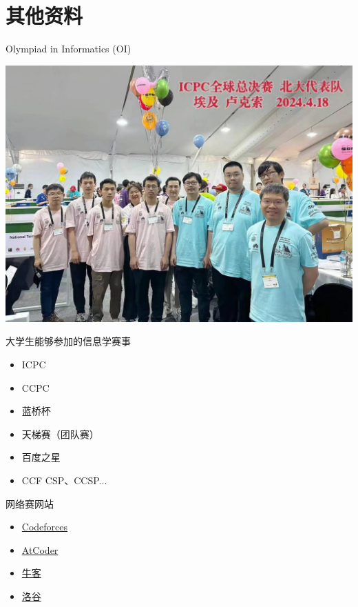 \documentclass[aspectratio=1610]{beamer}
\begin{document}
\section{其他资料}

\begin{frame}{Olympiad in Informatics (OI)}
    \begin{minipage} {0.6\linewidth}
        \centering
        \includegraphics[width=0.8\linewidth]{pic/OI.jpg}
    \end{minipage}
    \begin{minipage}{0.38\linewidth}
        大学生能够参加的信息学赛事
        \begin{center}
            \begin{itemize}
                \item ICPC
                \item CCPC
                \item 蓝桥杯
                \item 天梯赛（团队赛）
                \item 百度之星
                \item CCF CSP、CCSP...
            \end{itemize}
        \end{center}
    
        网络赛网站
        \begin{center}
            \begin{itemize}
                \item \href{https://codeforces.com}{Codeforces}
                \item \href{https://atcoder.jp}{AtCoder}
                \item \href{https://ac.nowcoder.com/}{牛客}
                \item \href{https://luogu.com.cn/}{洛谷}
            \end{itemize}
        \end{center}
    \end{minipage}
\end{frame}
\end{document}
